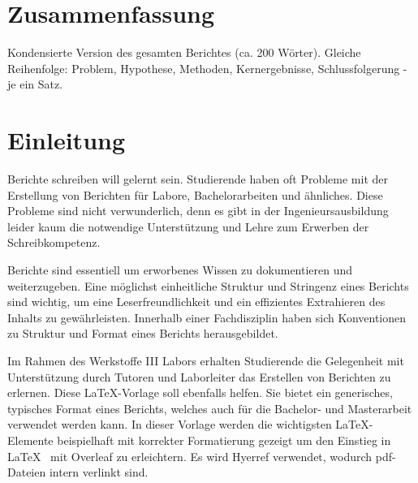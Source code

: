 
\chapter*{Zusammenfassung} 
Kondensierte Version des gesamten Berichtes (ca. 200 Wörter). Gleiche Reihenfolge: Problem, Hypothese, Methoden, Kernergebnisse, Schlussfolgerung - je ein Satz.
 \clearpage

 \setcounter{tocdepth}{2}
 \tableofcontents
 \clearpage

\setlength{\parskip}{1em} 

\chapter{Einleitung}\label{sec:}
Berichte schreiben will gelernt sein. Studierende haben oft Probleme mit der Erstellung von Berichten für Labore, Bachelorarbeiten und ähnliches. Diese Probleme sind nicht verwunderlich, denn es gibt in der Ingenieursausbildung leider kaum die notwendige Unterstützung und Lehre zum Erwerben der Schreibkompetenz. 

Berichte sind essentiell um erworbenes Wissen zu dokumentieren und weiterzugeben. Eine  möglichst einheitliche Struktur und Stringenz eines Berichts sind wichtig, um eine Leserfreundlichkeit und ein effizientes Extrahieren des Inhalts zu gewährleisten. Innerhalb einer Fachdisziplin haben sich Konventionen zu Struktur und Format eines Berichts herausgebildet.

Im Rahmen des Werkstoffe III Labors erhalten Studierende die Gelegenheit mit Unterstützung durch Tutoren und Laborleiter das Erstellen von Berichten zu erlernen. Diese \LaTeX -Vorlage soll ebenfalls helfen. Sie bietet ein generisches, typisches Format eines Berichts, welches auch für die Bachelor- und Masterarbeit verwendet werden kann. In dieser Vorlage werden die wichtigsten \LaTeX-Elemente beispielhaft mit korrekter Formatierung gezeigt um den Einstieg in \LaTeX ~ mit Overleaf zu erleichtern. Es wird Hyerref verwendet, wodurch pdf-Dateien intern verlinkt sind.
